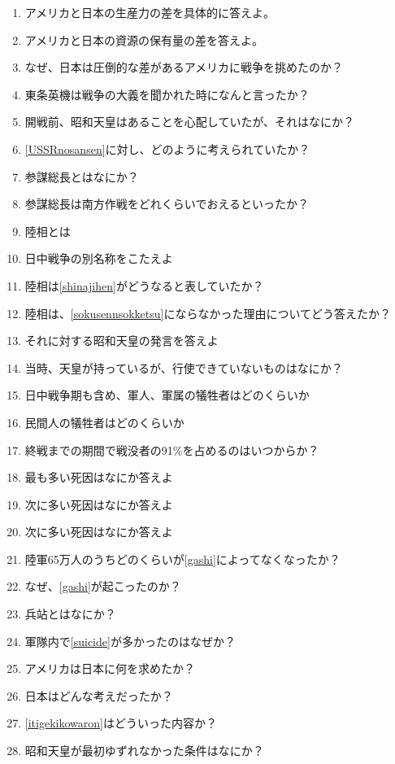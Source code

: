 \documentclass[]{jsarticle}
\begin{document}
\begin{enumerate}
	\item アメリカと日本の生産力の差を具体的に答えよ。
	\item アメリカと日本の資源の保有量の差を答えよ。
	\item なぜ、日本は圧倒的な差があるアメリカに戦争を挑めたのか？
	\item 東条英機は戦争の大義を聞かれた時になんと言ったか？
	\item 開戦前、昭和天皇はあることを心配していたが、それはなにか？\label{USSRnosansen}
	\item \ref{USSRnosansen}に対し、どのように考えられていたか？
	\item 参謀総長とはなにか？
	\item 参謀総長は南方作戦をどれくらいでおえるといったか？
	\item 陸相とは
	\item 日中戦争の別名称をこたえよ\label{shinajihen}
	\item 陸相は\ref{shinajihen}がどうなると表していたか？\label{sokusennsokketsu}
	\item 陸相は、\ref{sokusennsokketsu}にならなかった理由についてどう答えたか？
	\item それに対する昭和天皇の発言を答えよ
	\item 当時、天皇が持っているが、行使できていないものはなにか？
	\item 日中戦争期も含め、軍人、軍属の犠牲者はどのくらいか
	\item 民間人の犠牲者はどのくらいか
	\item 終戦までの期間で戦没者の91\%を占めるのはいつからか？
	\item 最も多い死因はなにか答えよ\label{gashi}
	\item 次に多い死因はなにか答えよ\label{disease}
	\item 次に多い死因はなにか答えよ\label{suicide}
	\item 陸軍65万人のうちどのくらいが\ref{gashi}によってなくなったか？
	\item なぜ、\ref{gashi}が起こったのか？
	\item 兵站とはなにか？
	\item 軍隊内で\ref{suicide}が多かったのはなぜか？
		\\
	\item アメリカは日本に何を求めたか？
	\item 日本はどんな考えだったか？\label{itigekikowaron}
	\item \ref{itigekikowaron}はどういった内容か？
		\\
	\item 昭和天皇が最初ゆずれなかった条件はなにか？\label{first_conditions}

\end{enumerate}
\end{document}

